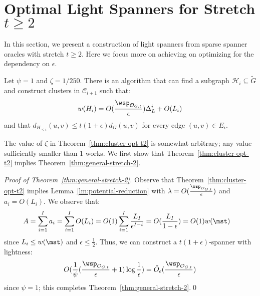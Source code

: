
\section{Optimal Light Spanners for Stretch $t\geq 2$}\label{sec:unified}



In this section, we present a construction of light spanners from sparse spanner oracles with stretch $t \geq 2$. Here we focus more on achieving on optimizing for the dependency on $\epsilon$. 

\begin{theorem}\label{thm:cluster-opt-t2}
	Let $\psi = 1$ and $\zeta = 1/250$. There is an algorithm that can find a subgraph $\mathcal{H}_i\subseteq \tilde{G}$ and construct clusters in $\mathcal{C}_{i+1}$  such that:
	\begin{equation*}
	w(H_i) = O( \frac{\wsp_{\mathcal{O}_{G,t}}}{\epsilon}) \Delta^i_{L} +  O(L_i)
	\end{equation*}
and that $d_{H_{\leq i}}(u,v) \leq t(1+\epsilon)d_G(u,v)$ for every edge $(u,v)\in E_i$. 
\end{theorem}

The value of $\zeta $ in Theorem~\ref{thm:cluster-opt-t2} is somewhat arbitrary; any value sufficiently smaller than $1$ works. We first show that Theorem~\ref{thm:cluster-opt-t2} implies Theorem~\ref{thm:general-stretch-2}. 

\begin{proof}[Proof of Theorem~\ref{thm:general-stretch-2}] Observe that Theorem~\ref{thm:cluster-opt-t2} implies Lemma~\ref{lm:potential-reduction} with $\lambda = O(\frac{\wsp_{\mathcal{O}_{G,t}}}{\epsilon})$ and $a_i = O(L_i)$.  We observe that: 
	\begin{equation}\label{eq:A-bound-stretch-2}
	\begin{split}
	A &= \sum_{i=1}^{I}a_i =\sum_{i=1}^{I}O(L_i)=  O(1) \sum_{i=1}^{I} \frac{L_I}{\epsilon^{I-i}} = O(\frac{L_I}{1-\epsilon}) = O(1) w(\mst) 
	\end{split}
	\end{equation}
	since $L_i\leq w(\mst)$ and $\epsilon\leq \frac{1}{2}$. Thus, we can construct a $t(1+\epsilon)$-spanner with lightness:
	\begin{equation}
	O(\frac{1}{\psi}(\frac{ \wsp_{\mathcal{O}_{G,t}}}{\epsilon} +  1)\log\frac{1}{\epsilon}) = \tilde{O}_{\epsilon}(\frac{\wsp_{\mathcal{O}_{G,t}}}{\epsilon})
	\end{equation}
	since $\psi = 1$; this completes Theorem~\ref{thm:general-stretch-2}.\qed
\end{proof}

